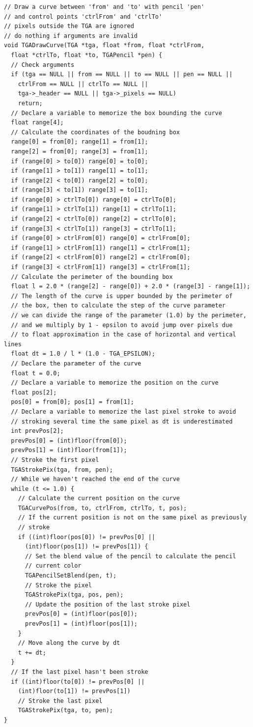 \documentclass[12pt, a4paper]{article}
\begin{document}
\begin{scriptsize}
\begin{ttfamily}
\begin{lstlisting}
// Draw a curve between 'from' and 'to' with pencil 'pen'
// and control points 'ctrlFrom' and 'ctrlTo'
// pixels outside the TGA are ignored
// do nothing if arguments are invalid
void TGADrawCurve(TGA *tga, float *from, float *ctrlFrom, 
  float *ctrlTo, float *to, TGAPencil *pen) {
  // Check arguments
  if (tga == NULL || from == NULL || to == NULL || pen == NULL ||
    ctrlFrom == NULL || ctrlTo == NULL ||
    tga->_header == NULL || tga->_pixels == NULL)
    return;
  // Declare a variable to memorize the box bounding the curve
  float range[4];
  // Calculate the coordinates of the boudning box
  range[0] = from[0]; range[1] = from[1];
  range[2] = from[0]; range[3] = from[1];
  if (range[0] > to[0]) range[0] = to[0];
  if (range[1] > to[1]) range[1] = to[1];
  if (range[2] < to[0]) range[2] = to[0];
  if (range[3] < to[1]) range[3] = to[1];
  if (range[0] > ctrlTo[0]) range[0] = ctrlTo[0];
  if (range[1] > ctrlTo[1]) range[1] = ctrlTo[1];
  if (range[2] < ctrlTo[0]) range[2] = ctrlTo[0];
  if (range[3] < ctrlTo[1]) range[3] = ctrlTo[1];
  if (range[0] > ctrlFrom[0]) range[0] = ctrlFrom[0];
  if (range[1] > ctrlFrom[1]) range[1] = ctrlFrom[1];
  if (range[2] < ctrlFrom[0]) range[2] = ctrlFrom[0];
  if (range[3] < ctrlFrom[1]) range[3] = ctrlFrom[1];
  // Calculate the perimeter of the bounding box
  float l = 2.0 * (range[2] - range[0]) + 2.0 * (range[3] - range[1]);
  // The length of the curve is upper bounded by the perimeter of
  // the box, then to calculate the step of the curve parameter
  // we can divide the range of the parameter (1.0) by the perimeter,
  // and we multiply by 1 - epsilon to avoid jump over pixels due 
  // to float approximation in the case of horizontal and vertical lines
  float dt = 1.0 / l * (1.0 - TGA_EPSILON);
  // Declare the parameter of the curve
  float t = 0.0;
  // Declare a variable to memorize the position on the curve
  float pos[2];
  pos[0] = from[0]; pos[1] = from[1];
  // Declare a variable to memorize the last pixel stroke to avoid
  // stroking several time the same pixel as dt is underestimated
  int prevPos[2];
  prevPos[0] = (int)floor(from[0]); 
  prevPos[1] = (int)floor(from[1]);
  // Stroke the first pixel
  TGAStrokePix(tga, from, pen);  
  // While we haven't reached the end of the curve
  while (t <= 1.0) {
    // Calculate the current position on the curve
    TGACurvePos(from, to, ctrlFrom, ctrlTo, t, pos);
    // If the current position is not on the same pixel as previously
    // stroke
    if ((int)floor(pos[0]) != prevPos[0] || 
      (int)floor(pos[1]) != prevPos[1]) {
      // Set the blend value of the pencil to calculate the pencil 
      // current color
      TGAPencilSetBlend(pen, t);
      // Stroke the pixel
      TGAStrokePix(tga, pos, pen);
      // Update the position of the last stroke pixel
      prevPos[0] = (int)floor(pos[0]); 
      prevPos[1] = (int)floor(pos[1]);
    }
    // Move along the curve by dt
    t += dt;
  }
  // If the last pixel hasn't been stroke
  if ((int)floor(to[0]) != prevPos[0] || 
    (int)floor(to[1]) != prevPos[1])
    // Stroke the last pixel
    TGAStrokePix(tga, to, pen);  
}
  

\end{lstlisting}
\end{ttfamily}
\end{scriptsize}
\end{document}
